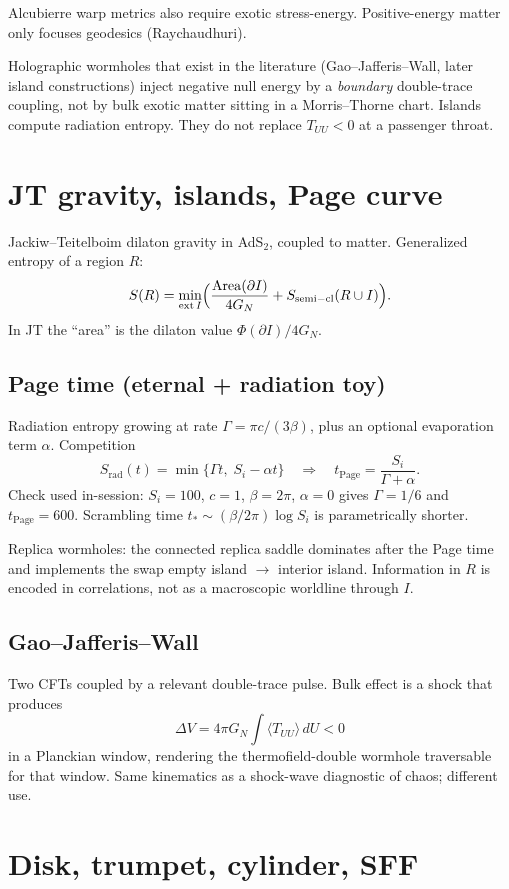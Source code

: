 \documentclass[11pt]{article}
\begin{document}
Alcubierre warp metrics also require exotic stress-energy. Positive-energy matter only focuses geodesics (Raychaudhuri).

Holographic wormholes that exist in the literature (Gao--Jafferis--Wall, later island constructions) inject negative null energy by a \emph{boundary} double-trace coupling, not by bulk exotic matter sitting in a Morris--Thorne chart. Islands compute radiation entropy. They do not replace $T_{UU}<0$ at a passenger throat.

\section{JT gravity, islands, Page curve}

Jackiw--Teitelboim dilaton gravity in AdS$_2$, coupled to matter. Generalized entropy of a region $R$:
\[
S(R)=\min_{\mathrm{ext}\,I}\Bigl(\frac{\mathrm{Area}(\partial I)}{4G_N}+S_{\mathrm{semi-cl}}(R\cup I)\Bigr).
\]
In JT the ``area'' is the dilaton value $\Phi(\partial I)/4G_N$.

\subsection{Page time (eternal + radiation toy)}
Radiation entropy growing at rate $\Gamma=\pi c/(3\beta)$, plus an optional evaporation term $\alpha$. Competition
\[
S_{\mathrm{rad}}(t)=\min\bigl\{\Gamma t,\; S_i-\alpha t\bigr\}
\quad\Rightarrow\quad
t_{\mathrm{Page}}=\frac{S_i}{\Gamma+\alpha}.
\]
Check used in-session: $S_i=100$, $c=1$, $\beta=2\pi$, $\alpha=0$ gives $\Gamma=1/6$ and $t_{\mathrm{Page}}=600$. Scrambling time $t_*\sim(\beta/2\pi)\log S_i$ is parametrically shorter.

Replica wormholes: the connected replica saddle dominates after the Page time and implements the swap empty island $\to$ interior island. Information in $R$ is encoded in correlations, not as a macroscopic worldline through $I$.

\subsection{Gao--Jafferis--Wall}
Two CFTs coupled by a relevant double-trace pulse. Bulk effect is a shock that produces
\[
\Delta V = 4\pi G_N \int\langle T_{UU}\rangle\,dU <0
\]
in a Planckian window, rendering the thermofield-double wormhole traversable for that window. Same kinematics as a shock-wave diagnostic of chaos; different use.

\section{Disk, trumpet, cylinder, SFF}
\end{document}
